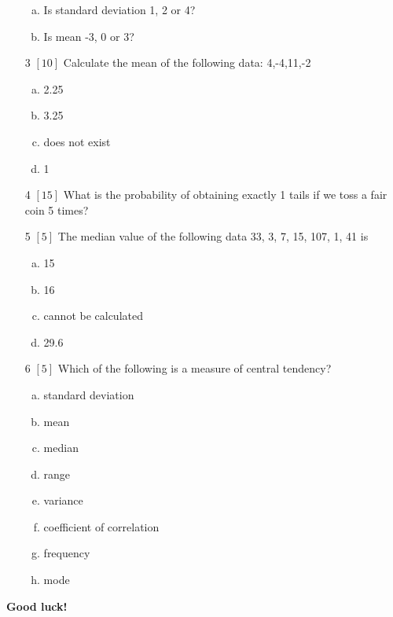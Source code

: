 \documentclass{article}
\begin{document}
\begin{itemize}
\begin{enumerate}[(a)]
\item Is standard deviation 1, 2 or 4? 
\vspace{\baselineskip}\item Is mean -3, 0 or 3? 
\vspace{\baselineskip}\end{enumerate}
\item[3] {\small $\left[10\right]$ }Calculate the mean of the following data:  
4,-4,11,-2\begin{enumerate}[(a)]
\item  2.25  
\item 3.25  
\item does not exist 
\item 1  
\end{enumerate}
\item[4] {\small $\left[15\right]$ }
What is the probability of obtaining exactly 1 tails if we toss a fair coin 5 times?
\item[5] {\small $\left[5\right]$ }The median value of the following data 33, 3, 7, 15, 107, 1, 41 is
\begin{enumerate}[(a)]
\item 15 
\item 16 
\item cannot be calculated 
\item 29.6 
\end{enumerate}
\item[6] {\small $\left[5\right]$ }Which of the following is a measure of central tendency?
\begin{enumerate}[(a)]
\item standard deviation 
\item mean 
\item median 
\item range 
\item variance 
\item coefficient of correlation 
\item frequency 
\item mode 
\end{enumerate}
\end{itemize}
{\bf Good luck! }\newpage
\end{document}
